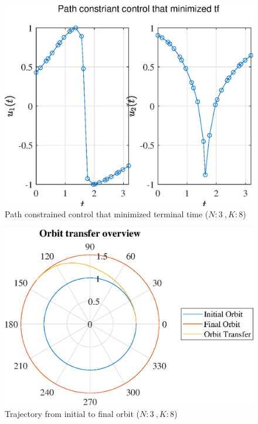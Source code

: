 \documentclass[]{article}
\begin{document}
	\begin{figure}
		\centering
		\includegraphics[scale=0.75]{path_N3_K8_C3_tf.eps}
		\caption{Path constrained control that minimized terminal time (\(N:3\ , K:8\))}
		\label{fig:path_N3_K8_C3_tf}
	\end{figure}
	\begin{figure}
		\centering
		\includegraphics[scale=0.75]{orbit_N3_K8_C3_tf.eps}
		\caption{Trajectory from initial to final orbit (\(N:3\ , K:8\))}
		\label{fig:orbit_N3_K8_C3_tf}
	\end{figure}
\end{document}
